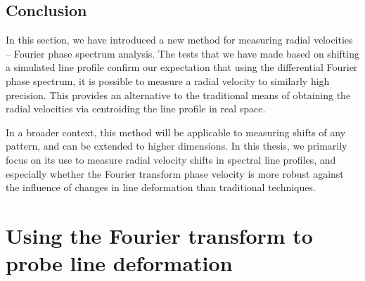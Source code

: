 %
%

\subsection{Conclusion}
In this section, we have introduced a new method for measuring radial velocities -- Fourier phase spectrum analysis. The tests that we have made based on shifting a simulated line profile confirm our expectation that using the differential Fourier phase spectrum, it is possible to measure a radial velocity to similarly high precision. This provides an alternative to the traditional means of obtaining the radial velocities via centroiding the line profile in real space. 

In a broader context, this method will be applicable to measuring shifts of any pattern, and can be extended to higher dimensions. In this thesis, we primarily focus on its use to measure radial velocity shifts in spectral line profiles, and especially whether the Fourier transform phase velocity is more robust against the influence of changes in line deformation than traditional techniques.


\section{Using the Fourier transform to probe line deformation}
\label{\thesection}
\label{sec:FT_ld}

